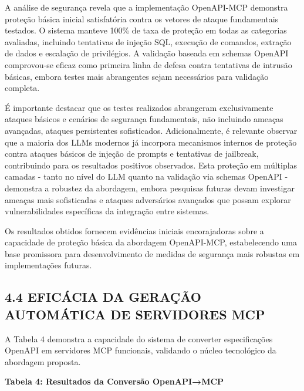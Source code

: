 \documentclass[
]{article}
\begin{document}
A análise de segurança revela que a implementação OpenAPI-MCP demonstra
proteção básica inicial satisfatória contra os vetores de ataque
fundamentais testados. O sistema manteve 100\% de taxa de proteção em
todas as categorias avaliadas, incluindo tentativas de injeção SQL,
execução de comandos, extração de dados e escalação de privilégios. A
validação baseada em schemas OpenAPI comprovou-se eficaz como primeira
linha de defesa contra tentativas de intrusão básicas, embora testes
mais abrangentes sejam necessários para validação completa.

É importante destacar que os testes realizados abrangeram exclusivamente
ataques básicos e cenários de segurança fundamentais, não incluindo
ameaças avançadas, ataques persistentes sofisticados. Adicionalmente, é
relevante observar que a maioria dos LLMs modernos já incorpora
mecanismos internos de proteção contra ataques básicos de injeção de
prompts e tentativas de jailbreak, contribuindo para os resultados
positivos observados. Esta proteção em múltiplas camadas - tanto no
nível do LLM quanto na validação via schemas OpenAPI - demonstra a
robustez da abordagem, embora pesquisas futuras devam investigar ameaças
mais sofisticadas e ataques adversários avançados que possam explorar
vulnerabilidades específicas da integração entre sistemas.

Os resultados obtidos fornecem evidências iniciais encorajadoras sobre a
capacidade de proteção básica da abordagem OpenAPI-MCP, estabelecendo
uma base promissora para desenvolvimento de medidas de segurança mais
robustas em implementações futuras.

\subsection{4.4 EFICÁCIA DA GERAÇÃO AUTOMÁTICA DE SERVIDORES
MCP}\label{eficuxe1cia-da-gerauxe7uxe3o-automuxe1tica-de-servidores-mcp}

A Tabela 4 demonstra a capacidade do sistema de converter especificações
OpenAPI em servidores MCP funcionais, validando o núcleo tecnológico da
abordagem proposta.

\textbf{Tabela 4: Resultados da Conversão OpenAPI→MCP}
\end{document}

